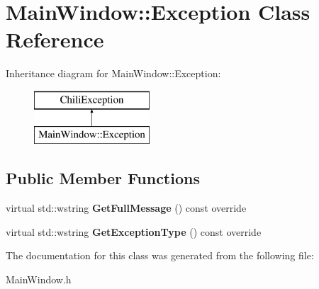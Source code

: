 \hypertarget{class_main_window_1_1_exception}{}\section{Main\+Window\+:\+:Exception Class Reference}
\label{class_main_window_1_1_exception}
Inheritance diagram for Main\+Window\+:\+:Exception\+:\begin{figure}[H]
\begin{center}
\leavevmode
\includegraphics[height=2.000000cm]{class_main_window_1_1_exception}
\end{center}
\end{figure}
\subsection*{Public Member Functions}
\begin{DoxyCompactItemize}
\item 
\mbox{\label{class_main_window_1_1_exception_ac18eb476a16e0e98803d385c7097d6e0}} 
virtual std\+::wstring {\bfseries Get\+Full\+Message} () const override
\item 
\mbox{\label{class_main_window_1_1_exception_a08e7ee28c3b282928f2c5de063a4bd83}} 
virtual std\+::wstring {\bfseries Get\+Exception\+Type} () const override
\end{DoxyCompactItemize}


The documentation for this class was generated from the following file\+:\begin{DoxyCompactItemize}
\item 
Main\+Window.\+h\end{DoxyCompactItemize}
